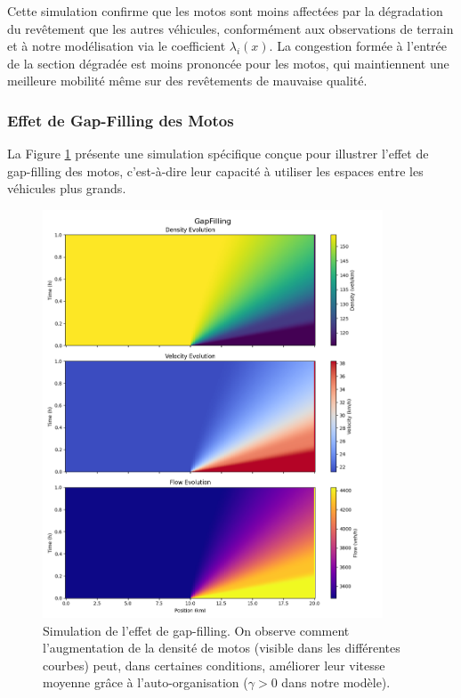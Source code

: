 Cette simulation confirme que les motos sont moins affectées par la dégradation du revêtement que les autres véhicules, conformément aux observations de terrain et à notre modélisation via le coefficient $\lambda_i(x)$. La congestion formée à l'entrée de la section dégradée est moins prononcée pour les motos, qui maintiennent une meilleure mobilité même sur des revêtements de mauvaise qualité.

\subsubsection{Effet de Gap-Filling des Motos}
\label{subsubsec:gap_filling}

La Figure \ref{fig:gap_filling} présente une simulation spécifique conçue pour illustrer l'effet de gap-filling des motos, c'est-à-dire leur capacité à utiliser les espaces entre les véhicules plus grands.

\begin{figure}[htbp]
\centering
\includegraphics[width=0.9\textwidth]{simulations/MULTICLASS/gapfilling/gapfilling.png}
\caption{Simulation de l'effet de gap-filling. On observe comment l'augmentation de la densité de motos (visible dans les différentes courbes) peut, dans certaines conditions, améliorer leur vitesse moyenne grâce à l'auto-organisation ($\gamma > 0$ dans notre modèle).}
\label{fig:gap_filling}
\end{figure}

